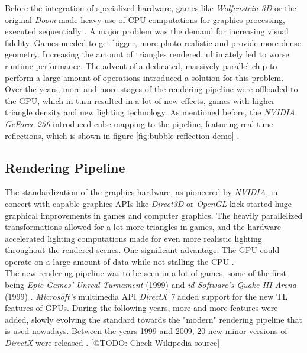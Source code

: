 \noindent
Before the integration of specialized hardware, games like \emph{Wolfenstein 3D} or the 
original \emph{Doom} made heavy use of \ac{CPU} computations for graphics processing, 
executed sequentially \cite{NVIDIA1999}. A major problem was the demand for increasing 
visual fidelity. Games needed to get bigger, more photo-realistic and provide more dense 
geometry. Increasing the amount of triangles rendered, ultimately led to worse runtime 
performance. The advent of a dedicated, massively parallel chip to perform a large amount of 
operations introduced a solution for this problem. Over the years, more and more stages of the 
rendering pipeline were offloaded to the \ac{GPU}, which in turn resulted in a lot of new effects, 
games with higher triangle density and new lighting technology. As mentioned before, the \emph{NVIDIA 
GeForce 256} introduced cube mapping to the pipeline, featuring real-time reflections, which is 
shown in figure \ref{fig:bubble-reflection-demo} \cite{Battaglia2024}.


\subsection*{Rendering Pipeline} \label{subsec-rendering-pipeline}

The standardization of the graphics hardware, as pioneered by \emph{NVIDIA}, in concert with capable 
graphics \ac{API}s like \emph{Direct3D} or \emph{OpenGL} kick-started huge graphical improvements in 
games and computer graphics. The heavily parallelized transformations allowed for a lot more triangles 
in games, and the hardware accelerated lighting computations made for even more realistic lighting 
throughout the rendered scenes. One significant advantage: The \ac{GPU} could operate on a large amount 
of data while not stalling the \ac{CPU} \cite{Fenno2024}.\\

\noindent
The new rendering pipeline was to be seen in a lot of games, some of the first being \emph{Epic Games'} 
\emph{Unreal Turnament} (1999) and \emph{id Software's} \emph{Quake III Arena} (1999) \cite{UnrealTurnament, 
Quake3Arena}. \emph{Microsoft's} multimedia \ac{API} \emph{DirectX 7} added support for the new \ac{TL} 
features of \ac{GPU}s. During the following years, more and more features were added, slowly evolving the 
standard towards the "modern" rendering pipeline that is used nowadays. Between the years 1999 and 2009,
20 new minor versions of \emph{DirectX} were released \cite{WikiDirectX}. [@TODO: Check Wikipedia source] 

